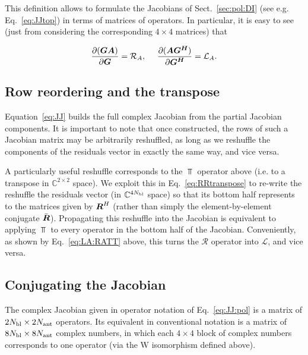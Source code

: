 \documentclass[useAMS,usenatbib]{mn2e}
\newcommand{\COMPLEX}{\mathbb{C}}
\newcommand{\mat}[1]{{\bmath{#1}}}
\begin{document}
This definition allows to formulate the Jacobians of Sect.~\ref{sec:pol:DI} (see e.g. Eq.~\ref{eq:JJtop}) 
in terms of matrices of operators. In particular, it is easy to see (just from considering the corresponding $4\times4$ matrices) that 

\[
\frac{\partial(\mat{GA})}{\partial{\mat{G}}} = \Rop{A},~~~~\frac{\partial(\mat{AG^H})}{\partial{\mat{G^H}}} = \Lop{A}.
\]

\subsection{Row reordering and the transpose}

Equation~\ref{eq:JJ} builds the full complex Jacobian from the partial Jacobian components. It is important to note that
once constructed, the rows of such a Jacobian matrix may be arbitrarily reshuffled, as long as we reshuffle the components of the residuals 
vector in exactly the same way, and vice versa.

A particularly useful reshuffle corresponds to the $\Top$ operator above (i.e. to a transpose in $\COMPLEX^{2\times2}$ space). We exploit this
in Eq.~\ref{eq:RRtranspose} to re-write the reshuffle the residuals vector (in $\COMPLEX^{4\Nbl}$ space) so that its bottom half represents
to the matrices given by $\mat{R}^H$ (rather than simply the element-by-element conjugate $\bar{\mat{R}}$). Propagating this reshuffle into
the Jacobian is equivalent to applying $\Top$ to every operator in the bottom half of the Jacobian. Conveniently, as shown by Eq.~\ref{eq:LA:RATT} above, this turns
the $\mathcal{R}$ operator into  $\mathcal{L}$, and vice versa.

\subsection{Conjugating the Jacobian}

The complex Jacobian given in operator notation of Eq.~\ref{eq:JJ:pol} is a matrix of $2N_\mathrm{bl}\times2N_\mathrm{ant}$ operators. Its equivalent in conventional
notation is a matrix of $8N_\mathrm{bl}\times8N_\mathrm{ant}$ complex numbers, in which each $4\times4$ block of complex numbers corresponds to one operator 
(via the $\mathrm{W}$ isomorphism defined above).






\label{lastpage}
\end{document}
